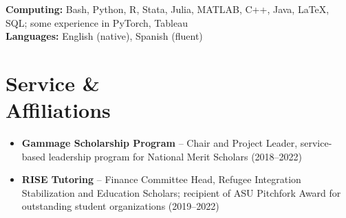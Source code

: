 \documentclass[line, margin, 10pt]{res}
\begin{document}
\begin{resume}
\textbf{Computing:} Bash, Python, R, Stata, Julia, MATLAB, C++, Java,
\LaTeX, SQL; some experience in PyTorch, Tableau \\[3pt]
\textbf{Languages:} English (native), Spanish (fluent)

\section{\sc Service \&\\ Affiliations}

\begin{itemize}
  \item \textbf{Gammage Scholarship Program} -- Chair and Project Leader,
        service-based leadership program for National Merit Scholars
        (2018--2022)
  \item \textbf{RISE Tutoring} -- Finance Committee Head, Refugee Integration
        Stabilization and Education Scholars; recipient of ASU Pitchfork Award
        for outstanding student organizations (2019--2022)
\end{itemize}

\end{resume}
\end{document}
